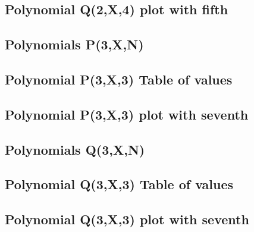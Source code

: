 \documentclass[12pt,letterpaper,oneside,reqno]{amsart}
\begin{document}
    \subsection{Polynomial Q(2,X,4) plot with fifth}
    


    \subsection{Polynomials P(3,X,N)}
    

    \subsection{Polynomial P(3,X,3) Table of values}
    

    \subsection{Polynomial P(3,X,3) plot with seventh}
    


    \subsection{Polynomials Q(3,X,N)}
    

    \subsection{Polynomial Q(3,X,3) Table of values}
    

    \subsection{Polynomial Q(3,X,3) plot with seventh}
    

    
    
\end{document}
